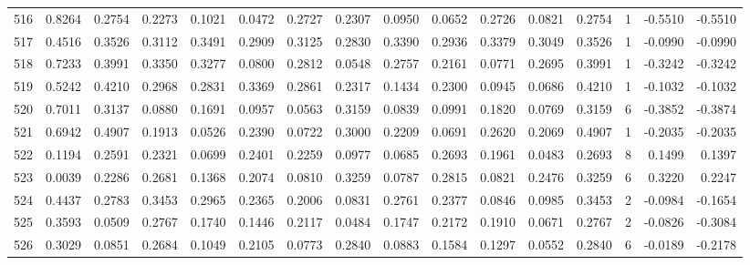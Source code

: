 \begin{tabular}{lrrrrrrrrrrrrrrr}
516 &      0.8264 &  0.2754 &  0.2273 &  0.1021 &  0.0472 &  0.2727 &  0.2307 &  0.0950 &  0.0652 &  0.2726 &   0.0821 &     0.2754 &      1 &                   -0.5510 &                    -0.5510 \\
517 &      0.4516 &  0.3526 &  0.3112 &  0.3491 &  0.2909 &  0.3125 &  0.2830 &  0.3390 &  0.2936 &  0.3379 &   0.3049 &     0.3526 &      1 &                   -0.0990 &                    -0.0990 \\
518 &      0.7233 &  0.3991 &  0.3350 &  0.3277 &  0.0800 &  0.2812 &  0.0548 &  0.2757 &  0.2161 &  0.0771 &   0.2695 &     0.3991 &      1 &                   -0.3242 &                    -0.3242 \\
519 &      0.5242 &  0.4210 &  0.2968 &  0.2831 &  0.3369 &  0.2861 &  0.2317 &  0.1434 &  0.2300 &  0.0945 &   0.0686 &     0.4210 &      1 &                   -0.1032 &                    -0.1032 \\
520 &      0.7011 &  0.3137 &  0.0880 &  0.1691 &  0.0957 &  0.0563 &  0.3159 &  0.0839 &  0.0991 &  0.1820 &   0.0769 &     0.3159 &      6 &                   -0.3852 &                    -0.3874 \\
521 &      0.6942 &  0.4907 &  0.1913 &  0.0526 &  0.2390 &  0.0722 &  0.3000 &  0.2209 &  0.0691 &  0.2620 &   0.2069 &     0.4907 &      1 &                   -0.2035 &                    -0.2035 \\
522 &      0.1194 &  0.2591 &  0.2321 &  0.0699 &  0.2401 &  0.2259 &  0.0977 &  0.0685 &  0.2693 &  0.1961 &   0.0483 &     0.2693 &      8 &                    0.1499 &                     0.1397 \\
523 &      0.0039 &  0.2286 &  0.2681 &  0.1368 &  0.2074 &  0.0810 &  0.3259 &  0.0787 &  0.2815 &  0.0821 &   0.2476 &     0.3259 &      6 &                    0.3220 &                     0.2247 \\
524 &      0.4437 &  0.2783 &  0.3453 &  0.2965 &  0.2365 &  0.2006 &  0.0831 &  0.2761 &  0.2377 &  0.0846 &   0.0985 &     0.3453 &      2 &                   -0.0984 &                    -0.1654 \\
525 &      0.3593 &  0.0509 &  0.2767 &  0.1740 &  0.1446 &  0.2117 &  0.0484 &  0.1747 &  0.2172 &  0.1910 &   0.0671 &     0.2767 &      2 &                   -0.0826 &                    -0.3084 \\
526 &      0.3029 &  0.0851 &  0.2684 &  0.1049 &  0.2105 &  0.0773 &  0.2840 &  0.0883 &  0.1584 &  0.1297 &   0.0552 &     0.2840 &      6 &                   -0.0189 &                    -0.2178 \\

\end{tabular}
